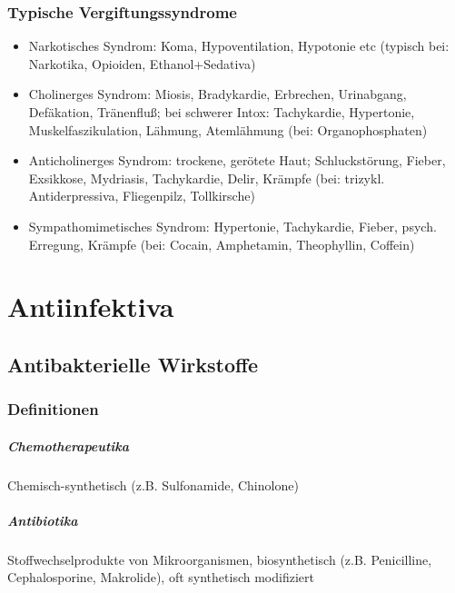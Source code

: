 \documentclass[10pt,a4paper]{report}
\begin{document}
\subsection{Typische Vergiftungssyndrome} %
\label{sub:typische_vergiftungssyndrome}
\begin{itemize}
	\item Narkotisches Syndrom: Koma, Hypoventilation, Hypotonie etc (typisch bei: Narkotika, Opioiden, Ethanol+Sedativa)
	\item Cholinerges Syndrom: Miosis, Bradykardie, Erbrechen, Urinabgang, Defäkation, Tränenfluß; bei schwerer Intox: Tachykardie, Hypertonie, Muskelfaszikulation, Lähmung, Atemlähmung (bei: Organophosphaten)
	\item Anticholinerges Syndrom: trockene, gerötete Haut; Schluckstörung, Fieber, Exsikkose, Mydriasis, Tachykardie, Delir, Krämpfe (bei: trizykl. Antiderpressiva, Fliegenpilz, Tollkirsche)
	\item Sympathomimetisches Syndrom: Hypertonie, Tachykardie, Fieber, psych. Erregung, Krämpfe (bei: Cocain, Amphetamin, Theophyllin, Coffein)
\end{itemize}
\chapter{Antiinfektiva} %
\label{cha:antiinfektiva}
\section{Antibakterielle Wirkstoffe} %
\label{sec:antibakterielle_wirkstoffe}
\subsection{Definitionen} %
\label{sub:definitonen}
\paragraph{Chemotherapeutika} %
\label{par:chemotherapeutika}
Chemisch-synthetisch (z.B. Sulfonamide, Chinolone) 
\paragraph{Antibiotika} %
\label{par:antibiotika}
Stoffwechselprodukte von Mikroorganismen, biosynthetisch (z.B. Penicilline, Cephalosporine, Makrolide), oft synthetisch modifiziert 
\end{document}
